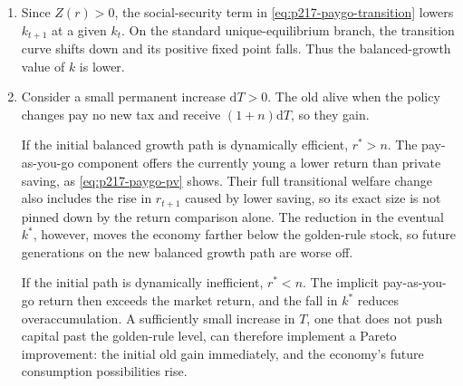 \begin{solution}
\begin{enumerate}[label=(\alph*)]
\begin{enumerate}[label=(\roman*)]
        \item Since \(Z(r)>0\), the social-security term in
        \eqref{eq:p217-paygo-transition} lowers \(k_{t+1}\) at a given
        \(k_t\). On the standard unique-equilibrium branch, the transition
        curve shifts down and its positive fixed point falls. Thus the
        balanced-growth value of \(k\) is lower.

        \item Consider a small permanent increase \(\mathrm dT>0\).
        The old alive when the policy changes pay no new tax and receive
        \((1+n)\mathrm dT\), so they gain.

        If the initial balanced growth path is dynamically efficient,
        \(r^*>n\). The pay-as-you-go component offers the currently young a
        lower return than private saving, as
        \eqref{eq:p217-paygo-pv} shows. Their full transitional welfare
        change also includes the rise in \(r_{t+1}\) caused by lower saving,
        so its exact size is not pinned down by the return comparison alone.
        The reduction in the eventual \(k^*\), however, moves the economy
        farther below the golden-rule stock, so future generations on the
        new balanced growth path are worse off.

        If the initial path is dynamically inefficient, \(r^*<n\).
        The implicit pay-as-you-go return then exceeds the market return,
        and the fall in \(k^*\) reduces overaccumulation. A sufficiently
        small increase in \(T\), one that does not push capital past the
        golden-rule level, can therefore implement a Pareto improvement:
        the initial old gain immediately, and the economy's future
        consumption possibilities rise.
    \end{enumerate}


\end{enumerate}
\end{solution}
